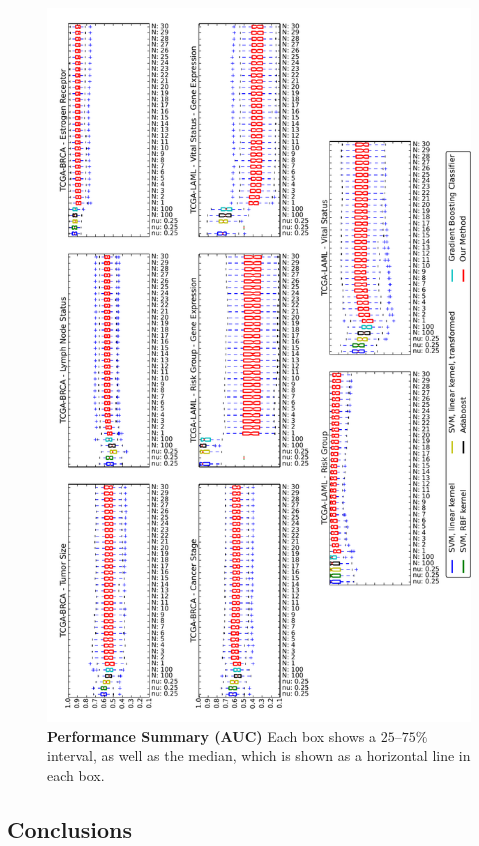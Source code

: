 \begin{landscape}
\begin{figure}[!th]
\centerline{\includegraphics[angle=270,width=15.7cm]{figs/rat/figs/performance}}
\caption{\textbf{Performance Summary (AUC)} Each box shows a $25$--$75\%$ interval, as well as the median, which is shown as a horizontal line in each box.}\label{fig:performance-summary}
\end{figure}
\end{landscape}

\subsection{Conclusions}

